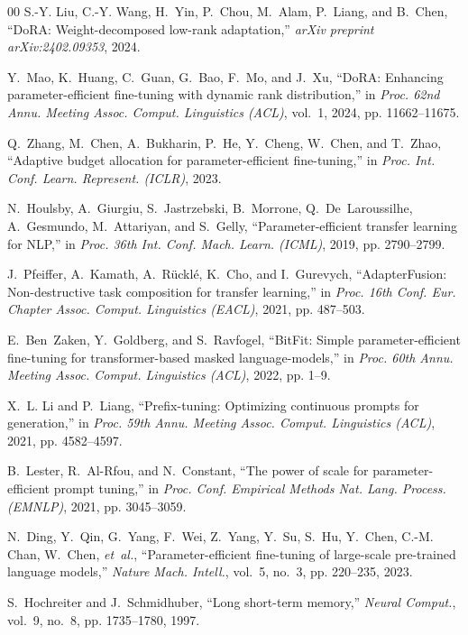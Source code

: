 \documentclass[conference]{IEEEtran}
\begin{document}
\begin{thebibliography}{00}
S.-Y. Liu, C.-Y. Wang, H.~Yin, P.~Chou, M.~Alam, P.~Liang, and B.~Chen, ``DoRA: Weight-decomposed low-rank adaptation,'' \emph{arXiv preprint arXiv:2402.09353}, 2024.

Y.~Mao, K.~Huang, C.~Guan, G.~Bao, F.~Mo, and J.~Xu, ``DoRA: Enhancing parameter-efficient fine-tuning with dynamic rank distribution,'' in \emph{Proc. 62nd Annu. Meeting Assoc. Comput. Linguistics (ACL)}, vol.~1, 2024, pp. 11662--11675.

Q.~Zhang, M.~Chen, A.~Bukharin, P.~He, Y.~Cheng, W.~Chen, and T.~Zhao, ``Adaptive budget allocation for parameter-efficient fine-tuning,'' in \emph{Proc. Int. Conf. Learn. Represent. (ICLR)}, 2023.

N.~Houlsby, A.~Giurgiu, S.~Jastrzebski, B.~Morrone, Q.~De~Laroussilhe, A.~Gesmundo, M.~Attariyan, and S.~Gelly, ``Parameter-efficient transfer learning for NLP,'' in \emph{Proc. 36th Int. Conf. Mach. Learn. (ICML)}, 2019, pp. 2790--2799.

J.~Pfeiffer, A.~Kamath, A.~R{\"u}ckl{\'e}, K.~Cho, and I.~Gurevych, ``AdapterFusion: Non-destructive task composition for transfer learning,'' in \emph{Proc. 16th Conf. Eur. Chapter Assoc. Comput. Linguistics (EACL)}, 2021, pp. 487--503.

E.~Ben~Zaken, Y.~Goldberg, and S.~Ravfogel, ``BitFit: Simple parameter-efficient fine-tuning for transformer-based masked language-models,'' in \emph{Proc. 60th Annu. Meeting Assoc. Comput. Linguistics (ACL)}, 2022, pp. 1--9.

X.~L. Li and P.~Liang, ``Prefix-tuning: Optimizing continuous prompts for generation,'' in \emph{Proc. 59th Annu. Meeting Assoc. Comput. Linguistics (ACL)}, 2021, pp. 4582--4597.

B.~Lester, R.~Al-Rfou, and N.~Constant, ``The power of scale for parameter-efficient prompt tuning,'' in \emph{Proc. Conf. Empirical Methods Nat. Lang. Process. (EMNLP)}, 2021, pp. 3045--3059.

N.~Ding, Y.~Qin, G.~Yang, F.~Wei, Z.~Yang, Y.~Su, S.~Hu, Y.~Chen, C.-M. Chan, W.~Chen, \emph{et~al.}, ``Parameter-efficient fine-tuning of large-scale pre-trained language models,'' \emph{Nature Mach. Intell.}, vol.~5, no.~3, pp. 220--235, 2023.

S.~Hochreiter and J.~Schmidhuber, ``Long short-term memory,'' \emph{Neural Comput.}, vol.~9, no.~8, pp. 1735--1780, 1997.


\end{thebibliography}
\end{document}
